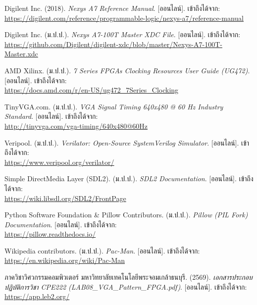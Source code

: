 \clearpage
{}

\begin{list}{}{%
    \setlength{\leftmargin}{1.2cm}%
    \setlength{\itemindent}{-1.2cm}%
    \setlength{\itemsep}{0.6em}%
    \setlength{\parsep}{0pt}%
}
    \sloppy
    \item Digilent Inc. (2018). \textit{Nexys A7 Reference Manual}. [ออนไลน์]. เข้าถึงได้จาก: \\
    \url{https://digilent.com/reference/programmable-logic/nexys-a7/reference-manual}

    \item Digilent Inc. (ม.ป.ป.). \textit{Nexys A7-100T Master XDC File}. [ออนไลน์]. เข้าถึงได้จาก: \\
    \url{https://github.com/Digilent/digilent-xdc/blob/master/Nexys-A7-100T-Master.xdc}

    \item AMD Xilinx. (ม.ป.ป.). \textit{7 Series FPGAs Clocking Resources User Guide (UG472)}. [ออนไลน์]. เข้าถึงได้จาก: \\
    \url{https://docs.amd.com/r/en-US/ug472_7Series_Clocking}

    \item TinyVGA.com. (ม.ป.ป.). \textit{VGA Signal Timing 640x480 @ 60 Hz Industry Standard}. [ออนไลน์]. เข้าถึงได้จาก: \\
    \url{http://tinyvga.com/vga-timing/640x480@60Hz}

    \item Veripool. (ม.ป.ป.). \textit{Verilator: Open-Source SystemVerilog Simulator}. [ออนไลน์]. เข้าถึงได้จาก: \\
    \url{https://www.veripool.org/verilator/}

    \item Simple DirectMedia Layer (SDL2). (ม.ป.ป.). \textit{SDL2 Documentation}. [ออนไลน์]. เข้าถึงได้จาก: \\
    \url{https://wiki.libsdl.org/SDL2/FrontPage}

    \item Python Software Foundation \& Pillow Contributors. (ม.ป.ป.). \textit{Pillow (PIL Fork) Documentation}. [ออนไลน์]. เข้าถึงได้จาก: \\
    \url{https://pillow.readthedocs.io/}

    \item Wikipedia contributors. (ม.ป.ป.). \textit{Pac-Man}. [ออนไลน์]. เข้าถึงได้จาก: \\
    \url{https://en.wikipedia.org/wiki/Pac-Man}

    \item ภาควิชาวิศวกรรมคอมพิวเตอร์ มหาวิทยาลัยเทคโนโลยีพระจอมเกล้าธนบุรี. (2569). \textit{เอกสารประกอบปฏิบัติการวิชา CPE222 (LAB08\_VGA\_Pattern\_FPGA.pdf)}. [ออนไลน์]. เข้าถึงได้จาก: \\
    \url{https://app.leb2.org/}
\end{list}
